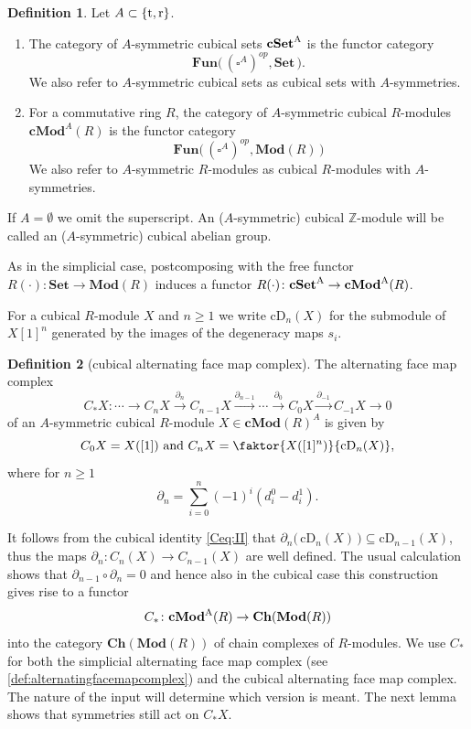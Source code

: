 \documentclass[12pt]{amsart}
\theoremstyle{plain}
\numberwithin{lemma}{\DefaultNumberTheoremWithin}
\numberwithin{claim}{\DefaultNumberTheoremWithin}
\numberwithin{theorem}{\DefaultNumberTheoremWithin}
\numberwithin{corollary}{\DefaultNumberTheoremWithin}
\numberwithin{proposition}{\DefaultNumberTheoremWithin}
\numberwithin{conjecture}{\DefaultNumberTheoremWithin}
\theoremstyle{definition}
\newtheorem*{definition}{Definition}
\theoremstyle{definition}
\numberwithin{question}{\DefaultNumberTheoremWithin}
\theoremstyle{definition}
\numberwithin{problem}{\DefaultNumberTheoremWithin}
\theoremstyle{remark}
\numberwithin{remark}{\DefaultNumberTheoremWithin}
\theoremstyle{remark}
\numberwithin{example}{\DefaultNumberTheoremWithin}
\def\Set{\mathbf{Set}}
\def\blt{*}
\def\rev{\textnormal{r}}
\def\trp{\textnormal{t}}
\def\cDeg{\mathrm{cD}}     %
\newcommand{\del}{\partial}
\newcommand{\Mod}[1]{\mathbf{Mod}(#1)}
\newcommand{\Ch}[1]{\mathbf{Ch}(#1)} %
\newcommand{\cMod}[2]{\mathbf{cMod}^{\textnormal{#1}}(#2)}  %
\newcommand{\cSet}[1]{\mathbf{cSet}^\textnormal{#1}} %
\newcommand{\firstappearence}[1]{{\sf #1}}
\begin{document}
   
\begin{definition}
Let $A\subset \{\trp,\rev\}$.
\begin{enumerate}
  \item The \firstappearence{category of $A$-symmetric cubical sets} $\cSet{A}$ is the functor category $$\mathbf{Fun}\big(\,(\square^A)^{op},\mathbf{Set}\,\big).$$
  We also refer to $A$-symmetric cubical sets as \firstappearence{cubical sets with $A$-symmetries}.
    \item For a commutative ring $R$, the \firstappearence{category of $A$-symmetric cubical
    $R$-modules} $\mathbf{cMod}^A(R)$ is the functor category 
     $$\mathbf{Fun}\big(\,(\square^A)^{op},\Mod{R}\,\big)$$
     We also refer to $A$-symmetric $R$-modules as \firstappearence{cubical $R$-modules with $A$-symmetries}.
  
    \end{enumerate}
    If $A=\emptyset$ we omit the superscript.
    An ($A$-symmetric) cubical $\mathbb{Z}$-module will be called an \firstappearence{($A$-symmetric) cubical abelian group}.
\end{definition}

As in the simplicial case, postcomposing with the free functor $R(\cdot)\colon\Set\to \Mod{R}$ induces a functor $R(\cdot)\colon\cSet{A}\to \cMod{A}{R}$.

For a cubical $R$-module $X$ and $n \geq 1$
we write $\cDeg_n(X)$ for the submodule of $X[1]^n$ generated by the images of the degeneracy maps $s_i$.

\begin{definition}[cubical alternating face map complex]
 The alternating face map complex 
 $$C_\blt X \colon
    \cdots \rightarrow C_{n} X \xrightarrow{\partial_n} C_{n-1} X \xrightarrow{\partial_{n-1}} \cdots \xrightarrow{\partial_0} C_0 X
    \xrightarrow{\partial_{-1}} C_{-1} X \rightarrow 0$$ of an $A$-symmetric cubical $R$-module $X\in \mathbf{cMod}(R)^{A}$ is given by $$C_0 X = X([1]) \text{ and }C_nX = \faktor{X([1]^n)}{\cDeg_n(X)},$$
    where 
    for $n \geq 1$ 
    \[
    \partial_n = \sum_{i=0}^n(-1)^i (d_i^0-d_i^1).
    \]
\end{definition}

It follows from the cubical identity \ref{Ceq:II} that $\del_n\big(\,\cDeg_n(X)\,\big)\subseteq \cDeg_{n-1}(X)$, thus the maps $\del_n\colon C_n(X)\to C_{n-1}(X)$ are well defined. The usual calculation shows that $\partial_{n-1} \circ \partial_n = 0$ and 
hence also in the cubical case this
construction gives rise to a functor 
$$C_\blt\colon\cMod{A}{R} \to \Ch{\Mod{R}}$$
into the category $\Ch{\Mod{R}}$ of chain complexes of
$R$-modules. We use $C_\blt$ for both the simplicial alternating face map complex (see \ref{def:alternatingfacemapcomplex}) and the cubical alternating face map complex. The nature of the input will determine which version is meant. The next lemma shows that symmetries still act on $C_\blt X$.
\end{document}
